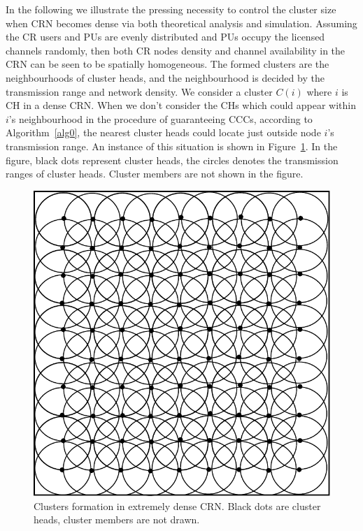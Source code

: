\documentclass[10pt,journal,compsoc]{IEEEtran}
\theoremstyle{mytheoremstyle}
\theoremstyle{mytheoremstyle}
\theoremstyle{mytheoremstyle}
\begin{document}
In the following we illustrate the pressing necessity to control the cluster size when CRN becomes dense via both theoretical analysis and simulation.
Assuming the CR users and PUs are evenly distributed and PUs occupy the licensed channels randomly, then both CR nodes density and channel availability in the CRN can be seen to be spatially homogeneous.
The formed clusters are the neighbourhoods of cluster heads, and the neighbourhood is decided by the transmission range and network density.
%
We consider a cluster $C(i)$ where $i$ is CH in a dense CRN. 
When we don't consider the CHs which could appear within $i$'s neighbourhood in the procedure of guaranteeing CCCs, according to Algorithm~\ref{alg0}, the nearest cluster heads could locate just outside node $i$'s transmission range.
An instance of this situation is shown in Figure~\ref{clusters_denseNetwork}.
%
In the figure, black dots represent cluster heads, the circles denotes the transmission ranges of cluster heads.
Cluster members are not shown in the figure.
\begin{figure}[h!]
  \centering
  \includegraphics[width=0.3\linewidth]{clusters_denseNetwork_2.pdf}
  \caption{Clusters formation in extremely dense CRN. Black dots are cluster heads, cluster members are not drawn.}
  \label{clusters_denseNetwork}
\end{figure}
\end{document}

